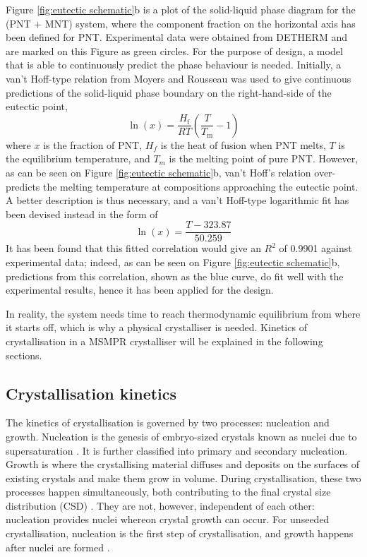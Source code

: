 Figure \ref{fig:eutectic schematic}b is a plot of the solid-liquid phase diagram for the (PNT + MNT) system, where the component fraction on the horizontal axis has been defined for PNT. Experimental data were obtained from DETHERM \cite{noauthor_detherm_2021} and are marked on this Figure as green circles. For the purpose of design, a model that is able to continuously predict the phase behaviour is needed. Initially, a van't Hoff-type relation from Moyers and Rousseau was used to give continuous predictions of the solid-liquid phase boundary on the right-hand-side of the eutectic point, \cite{moyers_crystallization_1987}
\begin{equation}\label{eq:vantHoff}
    \ln(x) = \frac{H_{\mathrm{f}}}{R T}\left(\frac{T}{T_{\mathrm{m}}} - 1\right)
\end{equation}
where $x$ is the fraction of PNT, $H_f$ is the heat of fusion when PNT melts, $T$ is the equilibrium temperature, and $T_{m}$ is the melting point of pure PNT. However, as can be seen on Figure \ref{fig:eutectic schematic}b, van't Hoff's relation over-predicts the melting temperature at compositions approaching the eutectic point. A better description is thus necessary, and a van't Hoff-type logarithmic fit has been devised instead in the form of 
\begin{equation} \label{eq:fittedvantHoffcorrelation}
    \ln(x) = \frac{T - 323.87}{50.259}
\end{equation}
It has been found that this fitted correlation would give an $R^2$ of 0.9901 against experimental data; indeed, as can be seen on Figure \ref{fig:eutectic schematic}b, predictions from this correlation, shown as the blue curve, do fit well with the experimental results, hence it has been applied for the design.

In reality, the system needs time to reach thermodynamic equilibrium from where it starts off, which is why a physical crystalliser is needed. Kinetics of crystallisation in a MSMPR crystalliser will be explained in the following sections.

\subsection{Crystallisation kinetics}
The kinetics of crystallisation is governed by two processes: nucleation and growth. Nucleation is the genesis of embryo-sized crystals known as nuclei due to supersaturation \cite{richardson_chemical_2006}. It is further classified into primary and secondary nucleation. Growth is where the crystallising material diffuses and deposits on the surfaces of existing crystals and make them grow in volume. During crystallisation, these two processes happen simultaneously, both contributing to the final crystal size distribution (CSD) \cite{richardson_chemical_2006}. They are not, however, independent of each other: nucleation provides nuclei whereon crystal growth can occur. For unseeded crystallisation, nucleation is the first step of crystallisation, and growth happens after nuclei are formed \cite{mullin_crystallization_2001}.

